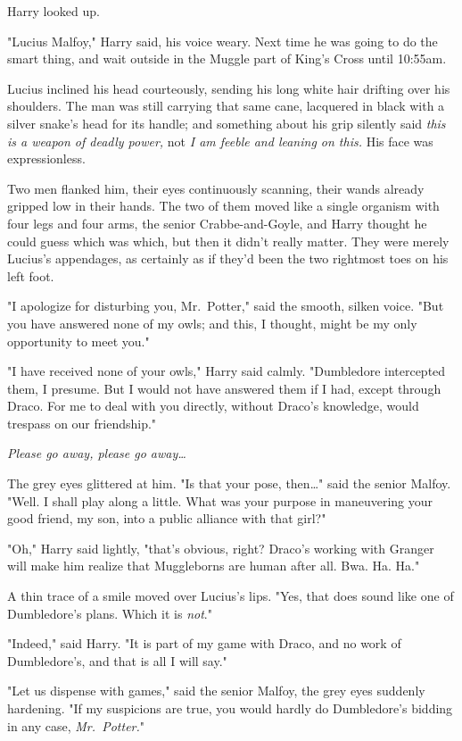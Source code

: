 Harry looked up.

"Lucius Malfoy," Harry said, his voice weary. Next time he was going to do the 
smart thing, and wait outside in the Muggle part of King's Cross until 10:55am.

Lucius inclined his head courteously, sending his long white hair drifting over 
his shoulders. The man was still carrying that same cane, lacquered in black 
with a silver snake's head for its handle; and something about his grip 
silently said \emph{this is a weapon of deadly power,} not \emph{I am feeble 
and leaning on this.} His face was expressionless.

Two men flanked him, their eyes continuously scanning, their wands already 
gripped low in their hands. The two of them moved like a single organism with 
four legs and four arms, the senior Crabbe-and-Goyle, and Harry thought he 
could guess which was which, but then it didn't really matter. They were merely 
Lucius's appendages, as certainly as if they'd been the two rightmost toes on 
his left foot.

"I apologize for disturbing you, Mr.~Potter," said the smooth, silken voice. 
"But you have answered none of my owls; and this, I thought, might be my only 
opportunity to meet you."

"I have received none of your owls," Harry said calmly. "Dumbledore intercepted 
them, I presume. But I would not have answered them if I had, except through 
Draco. For me to deal with you directly, without Draco's knowledge, would 
trespass on our friendship."

\emph{Please go away, please go away{\ldots}}

The grey eyes glittered at him. "Is that your pose, then{\ldots}" said the 
senior Malfoy. "Well. I shall play along a little. What was your purpose in 
maneuvering your good friend, my son, into a public alliance with that girl?"

"Oh," Harry said lightly, "that's obvious, right? Draco's working with Granger 
will make him realize that Muggleborns are human after all. Bwa. Ha. Ha."

A thin trace of a smile moved over Lucius's lips. "Yes, that does sound like 
one of Dumbledore's plans. Which it is \emph{not}."

"Indeed," said Harry. "It is part of my game with Draco, and no work of 
Dumbledore's, and that is all I will say."

"Let us dispense with games," said the senior Malfoy, the grey eyes suddenly 
hardening. "If my suspicions are true, you would hardly do Dumbledore's bidding 
in any case, \emph{Mr.~Potter.}"

